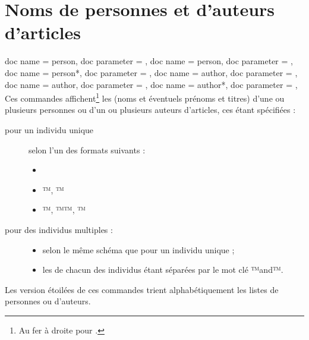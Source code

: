 \documentclass{letgut}
\begin{document}
\section[Personnes et auteurs]{Noms de personnes et d'auteurs d'articles}
\label{sec:sign-des-articl}


\begin{docCommands}[
  doc name = person,
  doc name = author,
  ]
  {
    {
      doc name = person,
      doc parameter = 
    },
    {
      doc name = person,
      doc parameter = 
    },
    {
      doc name = person*,
      doc parameter = 
    },
    {
      doc name = author,
      doc parameter = 
    },
    {
      doc name = author,
      doc parameter = 
    },
    {
      doc name = author*,
      doc parameter = 
    },
  }
  Ces commandes affichent\footnote{Au fer à droite pour .} les
   (noms et éventuels prénoms et titres) d'une ou plusieurs
  personnes ou d'un ou plusieurs auteurs d'articles, ces 
  étant spécifiées :
  \begin{description}
  \item[pour un individu unique] selon l'un des formats suivants :
    \begin{itemize}
    \item {}
    \item {}™, ™
    \item {}™, ™™, ™
    \end{itemize}
  \item[pour des individus multiples :]\leavevmode
    \begin{itemize}
    \item selon le même schéma que pour un individu unique ;
    \item les  de chacun des individus étant séparées par le mot clé
      ™and™.
    \end{itemize}
  \end{description}
  Les version étoilées de ces commandes trient alphabétiquement les listes de
  personnes ou d'auteurs.
\end{docCommands}
\end{document}
